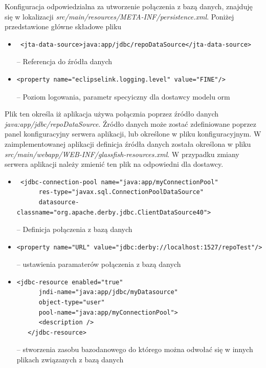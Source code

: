 Konfiguracja odpowiedzialna za utworzenie połączenia z bazą danych, znajduję się w lokalizacji \textit{src/main/resources/META-INF/persistence.xml}. Poniżej przedstawione główne składowe pliku

\begin{itemize}
	\item  {\footnotesize \begin{verbatim} <jta-data-source>java:app/jdbc/repoDataSource</jta-data-source> \end{verbatim}} -- Referencja do źródła danych
 	\item  {\footnotesize \begin{verbatim}<property name="eclipselink.logging.level" value="FINE"/>\end{verbatim}} -- Poziom logowania, parametr specyiczny dla dostawcy modelu orm
\end{itemize}


Plik ten określa iż aplikacja używa połącznia poprzez źródło danych \textit{java:app/jdbc/repoDataSource}. Źródło danych może zostać zdefiniowane poprzez panel konfiguracyjny serwera aplikacji, lub określone w pliku konfiguracyjnym. W zaimplementowanej aplikacji definicja źródła danych została określona w pliku \textit{src/main/webapp/WEB-INF/glassfish-resources.xml}. W przypadku zmiany serwera aplikacji należy zmienić ten plik na odpowiedni dla dostawcy.

\begin{itemize}
	\item  {\footnotesize \begin{verbatim} <jdbc-connection-pool name="java:app/myConnectionPool"
      res-type="javax.sql.ConnectionPoolDataSource"
      datasource-classname="org.apache.derby.jdbc.ClientDataSource40"> \end{verbatim}} -- Definicja połączenia z bazą danych
 	\item  {\footnotesize \begin{verbatim}<property name="URL" value="jdbc:derby://localhost:1527/repoTest"/>\end{verbatim}} -- ustawienia paramaterów połączenia z bazą danych
 	
 	
 		\item  {\footnotesize \begin{verbatim}<jdbc-resource enabled="true"
      jndi-name="java:app/jdbc/myDatasource"
      object-type="user"
      pool-name="java:app/myConnectionPool">
      <description />
   </jdbc-resource>\end{verbatim}} -- stworzenia zasobu bazodanowego do którego można odwołać się w innych plikach związanych z bazą danych
\end{itemize}

